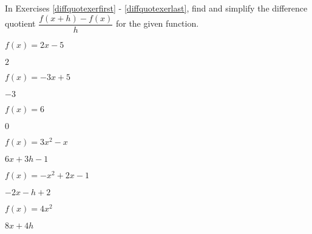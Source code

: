 \documentclass{ximera}
\begin{document}
	\author{Stitz-Zeager}



\label{ExercisesforFunctionArithmetic}

\begin{question}
    
In Exercises \ref{diffquotexerfirst} - \ref{diffquotexerlast}, find and simplify the difference quotient $\dfrac{f(x+h) - f(x)}{h}$ for the given function.

\begin{problem}\label{diffquotexerfirst}
$f(x) = 2x - 5$

\begin{solution}
    $2$
\end{solution}
\end{problem}
 
\begin{problem}
$f(x) = -3x + 5$   

\begin{solution}
    $-3$
\end{solution}
\end{problem} 

\begin{problem}
$f(x) = 6$   

\begin{solution}
    $0$
\end{solution}
\end{problem}  

\begin{problem}
$f(x) = 3x^2 - x$   

\begin{solution}
    $6x+3h-1$
\end{solution}
\end{problem} 

\begin{problem}
$f(x) = -x^2 + 2x - 1$   

\begin{solution}
    $-2x-h+2$
\end{solution}
\end{problem} 

\begin{problem}
$f(x) = 4x^2$   

\begin{solution}
    $8x+4h$
\end{solution}
\end{problem}


\end{question}
\end{document}

